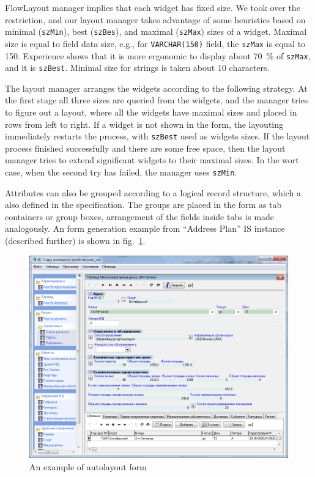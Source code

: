 \documentclass[conference]{IEEEtran}
\begin{document}
FlowLayout manager implies that each widget has fixed size.  We took over the restriction, and our layout manager takes advantage of some heuristics based on minimal (\texttt{szMin}), best (\texttt{szBes}), and maximal (\texttt{szMax}) sizes of a widget.  Maximal size is equal to field data size, e.g., for \texttt{VARCHAR(150)} field, the \texttt{szMax} is equal to 150.  Experience shows that it is more ergonomic to display about 70~\% of \texttt{szMax}, and it is \texttt{szBest}.  Minimal size for strings is taken about 10 characters.

The layout manager arranges the widgets according to the following strategy.  At the first stage all three sizes are queried from the widgets, and the manager tries to figure out a layout, where all the widgets have maximal sizes and placed in rows from left to right.  If a widget is not shown in the form, the layouting immediately restarts the process, with \texttt{szBest} used as widgets sizes.  If the layout process finished successfully and there are some free space, then the layout manager tries to extend significant widgets to their maximal sizes.  In the wort case, when the second try has failed, the manager uses \texttt{szMin}.

Attributes can also be grouped according to a logical record structure, which a also defined in the specification.  The groups are placed in the form as tab containers or group boxes, arrangement of the fields inside tabs is made analogously.  An form generation example from ``Address Plan'' IS instance (described further) is shown in fig.~\ref{fig:formex}.

\begin{figure}[tb]
  \centering
  \includegraphics[width=\linewidth]{formex.png}
  \caption{An example of autolayout form}
  \label{fig:formex}
\end{figure}
\end{document}
